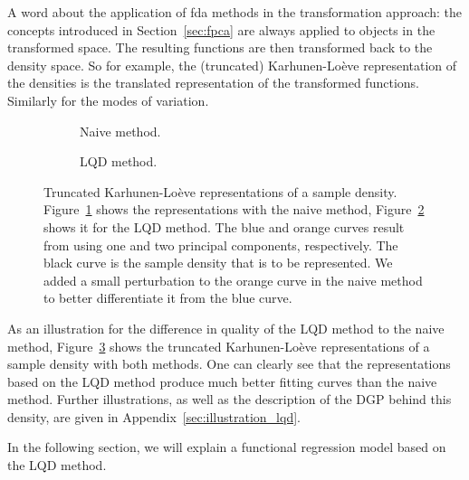 A word about the application of fda methods in the transformation approach: the concepts
introduced in Section~\ref{sec:fpca} are always applied to objects in the
transformed space. The resulting functions are then transformed back to the density
space. So for example, the (truncated) Karhunen-Loève representation of the densities is the
translated representation of the transformed functions. Similarly for the modes of variation.

\begin{figure}[h!]
    \centering
    \begin{subfigure}[b]{0.9\textwidth}
        \centering
        \resizebox{\linewidth}{!}{}
        \caption[Truncated representation --- naive]{Naive method.}
        \label{fig:naive_trunc_rep}
    \end{subfigure}
    \hfill %
    \begin{subfigure}[b]{0.9\textwidth}
        \centering
        \resizebox{\linewidth}{!}{}
        \caption[Truncated representation --- LQD method]{LQD method.}
        \label{fig:trunc_rep}
    \end{subfigure}
    \caption[Truncated Karhunen-Loève representations]{Truncated Karhunen-Loève
    representations of a sample density. Figure~\ref{fig:naive_trunc_rep} shows the
    representations with the naive method, Figure~\ref{fig:trunc_rep} shows it for
    the LQD method. The blue and orange curves result from using one
    and two principal components, respectively. The black curve is the sample density
    that is to be represented. We added a small perturbation to the orange curve in the
    naive method to better differentiate it from the blue curve.}
    \label{fig:trunc_reps}
\end{figure}

As an illustration for the difference in quality of the LQD method to the naive method,
Figure~\ref{fig:trunc_reps} shows the truncated Karhunen-Loève representations of a
sample density with both methods. One can clearly see that the representations based on
the LQD method produce much better fitting curves than the naive method. Further
illustrations, as well as the description of the DGP behind this density, are given in
Appendix~\ref{sec:illustration_lqd}.

In the following section, we will explain a functional regression model based on the
LQD method.

